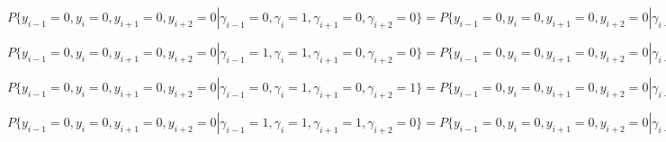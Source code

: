 ﻿\documentclass[a4paper,12pt]{article}
\theoremstyle{plain}
\begin{document}
$P\{y_{i-1} = 0, y_i = 0, y_{i+1} = 0, y_{i+2} = 0 |\gamma_{i-1}=0,\gamma_i=1,\gamma_{i+1}=0, \gamma_{i+2} = 0\}=P\{y_{i-1} = 0, y_i = 0, y_{i+1} = 0, y_{i+2} = 0 |\gamma_{i-1}=0,\gamma_i=0,\gamma_{i+1}=1, \gamma_{i+2} = 0\} =\frac{(1+\varepsilon)(1+\varepsilon^2)}{16};$\newline

$P\{y_{i-1} = 0, y_i = 0, y_{i+1} = 0, y_{i+2} = 0 |\gamma_{i-1}=1,\gamma_i=1,\gamma_{i+1}=0, \gamma_{i+2} = 0\}=P\{y_{i-1} = 0, y_i = 0, y_{i+1} = 0, y_{i+2} = 0 |\gamma_{i-1}=0,\gamma_i=0,\gamma_{i+1}=0, \gamma_{i+2} = 1\}=P\{y_{i-1} = 0, y_i = 0, y_{i+1} = 0, y_{i+2} = 0 |\gamma_{i-1}=1,\gamma_i=0,\gamma_{i+1}=0, \gamma_{i+2} = 1\}=P\{y_{i-1} = 0, y_i = 0, y_{i+1} = 0, y_{i+2} = 0 |\gamma_{i-1}=0,\gamma_i=0,\gamma_{i+1}=1, \gamma_{i+2} = 1\}=\frac{1+\varepsilon}{16};$\newline

$P\{y_{i-1} = 0, y_i = 0, y_{i+1} = 0, y_{i+2} = 0 |\gamma_{i-1}=0,\gamma_i=1,\gamma_{i+1}=0, \gamma_{i+2} = 1\}=P\{y_{i-1} = 0, y_i = 0, y_{i+1} = 0, y_{i+2} = 0 |\gamma_{i-1}=1,\gamma_i=0,\gamma_{i+1}=1, \gamma_{i+2} = 0\}=\frac{1+\varepsilon^2}{16};$\newline

$P\{y_{i-1} = 0, y_i = 0, y_{i+1} = 0, y_{i+2} = 0 |\gamma_{i-1}=1,\gamma_i=1,\gamma_{i+1}=1, \gamma_{i+2} = 0\}=P\{y_{i-1} = 0, y_i = 0, y_{i+1} = 0, y_{i+2} = 0 |\gamma_{i-1}=1,\gamma_i=1,\gamma_{i+1}=0, \gamma_{i+2} = 1\}=P\{y_{i-1} = 0, y_i = 0, y_{i+1} = 0, y_{i+2} = 0 |\gamma_{i-1}=1,\gamma_i=0,\gamma_{i+1}=1, \gamma_{i+2} = 1\}=P\{y_{i-1} = 0, y_i = 0, y_{i+1} = 0, y_{i+2} = 0 |\gamma_{i-1}=0,\gamma_i=1,\gamma_{i+1}=1, \gamma_{i+2} =P\{y_{i-1} = 0, y_i = 0, y_{i+1} = 0, y_{i+2} = 0 |\gamma_{i-1}=1,\gamma_i=1,\gamma_{i+1}=1, \gamma_{i+2}= 1\}=\frac{1}{16};$\newline
\end{document}
